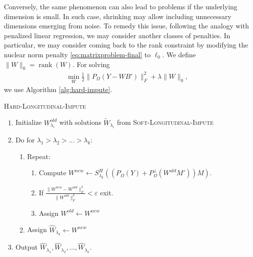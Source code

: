 \documentclass[preprint]{imsart}
\numberwithin{equation}{section}
\theoremstyle{plain}
\DeclareMathOperator*{\rank}{rank}
\begin{document}

Conversely, the same phenomenon can also lead to problems if the underlying dimension is small. In such case, shrinking may allow including unnecessary dimensions emerging from noise. To remedy this issue, following the analogy with penalized linear regression, we may consider another classes of penalties. In particular, we may consider coming back to the rank constraint by modifying the nuclear norm penalty \eqref{eq:matrixproblem-final} to $\ell_0$. We define $\|W\|_0 = \rank(W)$. For solving
\begin{align}\label{eq:matrixproblem-final-l0}
\min_{W} \frac{1}{2} \|P_\Omega(Y - WB')\|_F^2 + \lambda\|W\|_0,
\end{align}
we use Algorithm \ref{alg:hard-impute}. %

\begin{algorithm}
\caption{\textsc{Hard-Longitudinal-Impute}\label{alg:hard-impute}}
\begin{enumerate}
\item Initialize $W^{old}_{\lambda_i}$ with solutions $\tilde{W}_{\lambda_i}$ from \textsc{Soft-Longitudinal-Impute}
\item Do for $\lambda_1 > \lambda_2 > ... > \lambda_k$:
\begin{enumerate}
\item Repeat:
\begin{enumerate}
\item Compute $W^{new} \leftarrow S_{\lambda_k}^H( (P_\Omega(Y) + P_\Omega^\perp(W^{old}M'))M )$.
\item If $\frac{\|W^{new} - W^{old}\|_F^2}{\|W^{old}\|_F^2} < \varepsilon$ exit.
\item Assign $W^{old} \leftarrow W^{new}$
\end{enumerate}
\item Assign $\hat{W}_{\lambda_k} \leftarrow W^{new}$
\end{enumerate}
\item Output $\hat{W}_{\lambda_1}, \hat{W}_{\lambda_2}, ... , \hat{W}_{\lambda_k}$.
\end{enumerate}
\end{algorithm}
\end{document}
